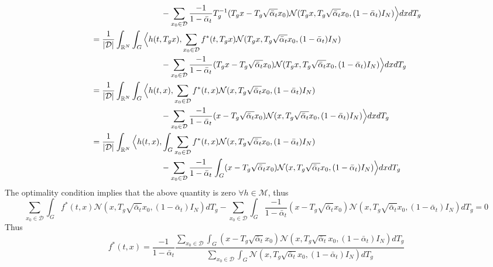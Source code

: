\documentclass[a4paper,10pt]{article}
\begin{document}
\begin{align*}
    & \hspace{3cm} -\sum_{x_0  \in \mathcal{D}} \frac{-1}{1-\bar \alpha_t} T_g^{-1}(T_gx -T_g \sqrt{\bar \alpha_t}x_0)\mathcal{N}(T_gx,T_g \sqrt{\bar \alpha_t}x_0,(1-\bar\alpha_t)I_N)  \Big\rangle dx dT_g\\
    &= \frac{1}{|\mathcal{D}|} \int_{\R^N} \int_G\Big\langle h(t,T_gx),\sum_{x_0  \in \mathcal{D}}f^*(t,T_gx) \mathcal{N}(T_gx,T_g \sqrt{\bar \alpha_t}x_0,(1-\bar\alpha_t)I_N)\\
    & \hspace{3cm}-\sum_{x_0  \in \mathcal{D}} \frac{-1}{1-\bar \alpha_t} (T_gx -T_g \sqrt{\bar \alpha_t}x_0)\mathcal{N}(T_gx,T_g \sqrt{\bar \alpha_t}x_0,(1-\bar\alpha_t)I_N)  \Big\rangle dx dT_g\\
    &= \frac{1}{|\mathcal{D}|} \int_{\R^N} \int_G\Big\langle h(t,x),\sum_{x_0  \in \mathcal{D}}f^*(t,x) \mathcal{N}(x,T_g \sqrt{\bar \alpha_t}x_0,(1-\bar\alpha_t)I_N)\\
    & \hspace{3cm}-\sum_{x_0  \in \mathcal{D}} \frac{-1}{1-\bar \alpha_t} (x -T_g \sqrt{\bar \alpha_t}x_0)\mathcal{N}(x,T_g \sqrt{\bar \alpha_t}x_0,(1-\bar\alpha_t)I_N)  \Big\rangle dx dT_g\\
    &= \frac{1}{|\mathcal{D}|} \int_{\R^N}  \Big\langle h(t,x),\int_G \sum_{x_0  \in \mathcal{D}}f^*(t,x) \mathcal{N}(x,T_g \sqrt{\bar \alpha_t}x_0,(1-\bar\alpha_t)I_N)\\
    & \hspace{3cm}-\sum_{x_0  \in \mathcal{D}} \frac{-1}{1-\bar \alpha_t} \int_G(x -T_g \sqrt{\bar \alpha_t}x_0)\mathcal{N}(x,T_g \sqrt{\bar \alpha_t}x_0,(1-\bar\alpha_t)I_N) \Big\rangle dx dT_g\\
\end{align*}
The optimality condition implies that the above quantity is zero $\forall h \in \mathcal{M}$, thus
\begin{equation*}
    \sum_{x_0  \in \mathcal{D}}\int_G f^*(t,x) \mathcal{N}(x,T_g \sqrt{\bar \alpha_t}x_0,(1-\bar\alpha_t)I_N)dT_g-\sum_{x_0  \in \mathcal{D}} \int_G \frac{-1}{1-\bar \alpha_t} (x -T_g \sqrt{\bar \alpha_t}x_0)\mathcal{N}(x,T_g \sqrt{\bar \alpha_t}x_0,(1-\bar\alpha_t)I_N)dT_g  =0
\end{equation*}
Thus
\begin{equation*}
    f^*(t,x) =\frac{-1}{1-\bar \alpha_t}\frac{\sum_{x_0  \in \mathcal{D}}\int_G  (x -T_g \sqrt{\bar \alpha_t}x_0)\mathcal{N}(x,T_g \sqrt{\bar \alpha_t}x_0,(1-\bar\alpha_t)I_N) dT_g}{\sum_{x_0  \in \mathcal{D}}\int_G \mathcal{N}(x,T_g \sqrt{\bar \alpha_t}x_0,(1-\bar\alpha_t)I_N) d T_g}
\end{equation*}
\end{document}
